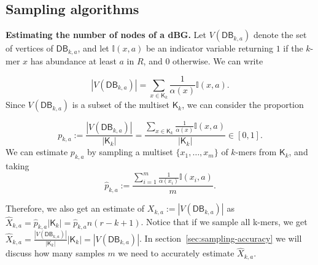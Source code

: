 \documentclass[a4paper,11pt]{article}
\newcommand{\alex}[1]{{\color{blue}{#1}}}
\newcommand{\DB}{\mathsf{DB}_{k,a}}
\newcommand{\K}{\mathsf{K}}
\newcommand{\abu}{\alpha}
\renewcommand{\geq}{\geqslant}
\begin{document}
\alex{Say that one of the main ideas is to do weighted sampling.}

\subsection{Sampling algorithms} %
\label{sub:algorithm}


\noindent \textbf{Estimating the number of nodes of a dBG.} Let $V(\DB)$ denote the set of vertices of $\DB$, and let $\mathbb{I}(x,a)$ be an indicator variable returning $1$ if the $k$-mer $x$ has abundance at least $a$ in $R$, and $0$ otherwise. We can write

\[|V(\DB)| = \sum_{x \in \K_k} \frac{1}{\abu(x)}\mathbb{I}(x,a).\]
Since $V(\DB)$ is a subset of the multiset $\K_k$, we can consider the proportion 

\[p_{k,a} := \frac{|V(\DB)|}{|\K_k|} = \frac{\sum_{x \in \K_k} \frac{1}{\abu(x)}\mathbb{I}(x,a)}{|\K_k|} \in [0,1].\]
%
%
We can estimate $p_{k,a}$ by sampling a multiset $\{x_1,\dots,x_m\}$ of $k$-mers from $\K_k$, and taking
\[\hat{p}_{k,a} := \frac{\sum_{i = 1}^m \frac{1}{\abu(x_i)}\mathbb{I}(x_i, a)}{m}.\]

Therefore, we also get an estimate of $X_{k,a} := |V(\DB)|$ as $\hat{X}_{k,a} = \hat{p}_{k,a}|\K_k| = \hat{p}_{k,a} n(r-k+1)$. Notice that if we sample all k-mers, we get $\hat{X}_{k,a} = \frac{|V(\DB)|}{|\K_k|}|\K_k| = |V(\DB)|$. In section~\ref{sec:sampling-accuracy} we will discuss how many samples $m$ we need to accurately estimate $\hat{X}_{k,a}$.


\alex{Say that we can implement this for all abundances}
\end{document}
